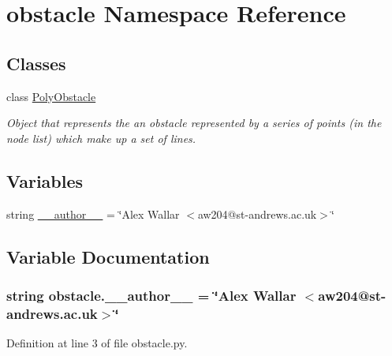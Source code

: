 \hypertarget{namespaceobstacle}{\section{obstacle Namespace Reference}
\label{namespaceobstacle}
}
\subsection*{Classes}
\begin{DoxyCompactItemize}
\item 
class \hyperlink{classobstacle_1_1PolyObstacle}{Poly\-Obstacle}
\begin{DoxyCompactList}\small\item\em Object that represents the an obstacle represented by a series of points (in the node list) which make up a set of lines. \end{DoxyCompactList}\end{DoxyCompactItemize}
\subsection*{Variables}
\begin{DoxyCompactItemize}
\item 
string \hyperlink{namespaceobstacle_a1c1558f418cc7a0e89e687fea6f31edc}{\-\_\-\-\_\-author\-\_\-\-\_\-} = \char`\"{}Alex Wallar $<$aw204@st-\/andrews.\-ac.\-uk$>$\char`\"{}
\end{DoxyCompactItemize}


\subsection{Variable Documentation}
\hypertarget{namespaceobstacle_a1c1558f418cc7a0e89e687fea6f31edc}{
\subsubsection[{\-\_\-\-\_\-author\-\_\-\-\_\-}]{\setlength{\rightskip}{0pt plus 5cm}string obstacle.\-\_\-\-\_\-author\-\_\-\-\_\- = \char`\"{}Alex Wallar $<$aw204@st-\/andrews.\-ac.\-uk$>$\char`\"{}}}\label{namespaceobstacle_a1c1558f418cc7a0e89e687fea6f31edc}


Definition at line 3 of file obstacle.\-py.

